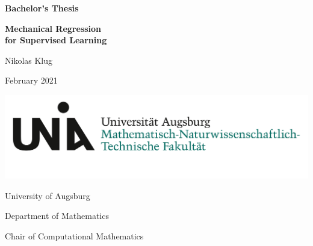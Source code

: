 \begin{titlepage}
	\centering
	
	\large{\textbf{Bachelor's Thesis}}
	\vspace{0.4cm}
	
	\huge{\textbf{Mechanical Regression \\for Supervised Learning}}\par
	
	\vspace{1cm}
	\Large{Nikolas Klug}
	
	\vspace{1cm}
	\Large{February 2021}
	
	\vspace{\fill}
	\includegraphics[scale=0.5]{figures/Uni_Aug_Logo_MNTF_RGB.png}
	\vspace{5mm}
	
	University of Augsburg
	
	Department of Mathematics
	
	Chair of Computational Mathematics
\end{titlepage}

\normalfont
\restoregeometry
\pagebreak

